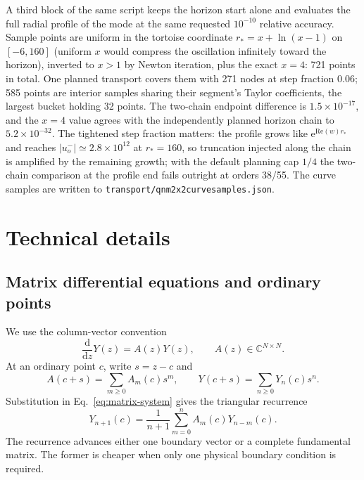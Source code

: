 \documentclass[11pt]{article}
\newcommand{\dd}{\mathrm d}
\renewcommand{\_}{\origunderscore\allowbreak}
\begin{document}
A third block of the same script keeps the horizon start alone and evaluates the full
radial profile of the mode at the same requested $10^{-10}$ relative accuracy.  Sample
points are uniform in the tortoise coordinate $r_\ast=x+\ln(x-1)$ on $[-6,160]$ (uniform
$x$ would compress the oscillation infinitely toward the horizon), inverted to $x>1$ by
Newton iteration, plus the exact $x=4$: 721 points in total.  One planned transport
covers them with 271 nodes at step fraction $0.06$; 585 points are interior samples
sharing their segment's Taylor coefficients, the largest bucket holding 32 points.  The
two-chain endpoint difference is $1.5\times10^{-17}$, and the $x=4$ value agrees with the
independently planned horizon chain to $5.2\times10^{-32}$.  The tightened step fraction
matters: the profile grows like $\mathrm{e}^{\mathrm{Re}(w)r_\ast}$ and reaches
$|u^-_o|\simeq2.8\times10^{12}$ at $r_\ast=160$, so truncation injected along the chain is
amplified by the remaining growth; with the default planning cap $1/4$ the two-chain
comparison at the profile end fails outright at orders 38/55.  The curve samples are
written to \texttt{transport/qnm\_2x2\_curve\_samples.json}.

\section{Technical details}
\label{sec:technical-details}

\subsection{Matrix differential equations and ordinary points}
\label{subsec:ordinary}

We use the column-vector convention
\begin{equation}
  \frac{\dd}{\dd z}Y(z)=A(z)Y(z),
  \qquad A(z)\in\mathbb C^{N\times N}.
  \label{eq:matrix-system}
\end{equation}
At an ordinary point $c$, write $s=z-c$ and
\begin{equation}
  A(c+s)=\sum_{m\geq0}A_m(c)s^m,
  \qquad
  Y(c+s)=\sum_{n\geq0}Y_n(c)s^n.
\end{equation}
Substitution in Eq.~\eqref{eq:matrix-system} gives the triangular recurrence
\begin{equation}
  Y_{n+1}(c)=\frac{1}{n+1}\sum_{m=0}^{n}A_m(c)Y_{n-m}(c).
  \label{eq:ordinary-recurrence}
\end{equation}
The recurrence advances either one boundary vector or a complete fundamental matrix.  The
former is cheaper when only one physical boundary condition is required.
\end{document}
